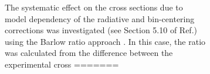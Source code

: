 \documentclass[aps, prl]{revtex4-2}  %
\begin{document}
\begin{figure}[!h]
\begin{figure}[!h]
\indent The systematic effect on the cross sections due to model dependency of the radiative and bin-centering corrections was investigated (see Section 5.10 of Ref.\cite{cyero_phdthesis})
using the Barlow ratio approach \cite{barlow2002systematic,barlow2017}. In this case, the ratio was calculated from the difference between the experimental cross
=======

\end{figure}
\end{figure}
\end{document}
